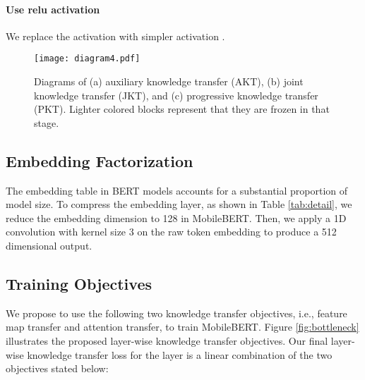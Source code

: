 \documentclass[11pt,a4paper]{article}
\begin{document}
\paragraph{Use relu activation} We replace the  activation with simpler  activation \citep{nair2010rectified}.

\makeatletter
\newcommand{\removelatexerror}{\let\@latex@error\@gobble}
\makeatother

\newcommand\mycommfont[1]{\scriptsize\ttfamily{#1}}

\begin{figure*}[t]
\begin{small}
\centering
\texttt{[image: diagram4.pdf]}
\end{small}
  \vspace{-1.5em}
  \caption{Diagrams of (a) auxiliary knowledge transfer (AKT), (b) joint knowledge transfer (JKT), and (c) progressive knowledge transfer (PKT). Lighter colored blocks represent that they are frozen in that stage. 
}
\label{fig:diagram}
\end{figure*}



\subsection{Embedding Factorization}

The embedding table in BERT models accounts for a substantial proportion of model size. To compress the embedding layer, as shown in Table \ref{tab:detail}, 
we reduce the embedding dimension to 128 in MobileBERT. Then, we apply a 1D convolution with kernel size 3 on the raw token embedding to produce a 512 dimensional output.





\subsection{Training Objectives}





We propose to use the following two knowledge transfer objectives, i.e., feature map transfer and attention transfer, to train MobileBERT. 
Figure \ref{fig:bottleneck} illustrates the proposed layer-wise knowledge transfer objectives. Our final layer-wise knowledge transfer loss  for the  layer is a linear combination of the two objectives stated below:
\end{document}
